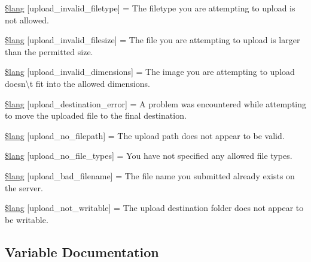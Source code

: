 \begin{DoxyCompactItemize}
\item 
\hyperlink{upload__lang_8php_ac8631aa85ed80396bd78e91a76d5fd38}{\$lang} \mbox{[}\textquotesingle{}upload\+\_\+invalid\+\_\+filetype\textquotesingle{}\mbox{]} = \textquotesingle{}The filetype you are attempting to upload is not allowed.\textquotesingle{}
\item 
\hyperlink{upload__lang_8php_a832b3ec1d84b1d48a488cf525954d8f2}{\$lang} \mbox{[}\textquotesingle{}upload\+\_\+invalid\+\_\+filesize\textquotesingle{}\mbox{]} = \textquotesingle{}The file you are attempting to upload is larger than the permitted size.\textquotesingle{}
\item 
\hyperlink{upload__lang_8php_a4e796eeccf7df90acffea7884a5bd558}{\$lang} \mbox{[}\textquotesingle{}upload\+\_\+invalid\+\_\+dimensions\textquotesingle{}\mbox{]} = \textquotesingle{}The image you are attempting to upload doesn\textbackslash{}\textquotesingle{}t fit into the allowed dimensions.\textquotesingle{}
\item 
\hyperlink{upload__lang_8php_a31be70c748b9bfc43dd7468e1fa64c42}{\$lang} \mbox{[}\textquotesingle{}upload\+\_\+destination\+\_\+error\textquotesingle{}\mbox{]} = \textquotesingle{}A problem was encountered while attempting to move the uploaded file to the final destination.\textquotesingle{}
\item 
\hyperlink{upload__lang_8php_a3c17908c53072c6a5ef593760aaaa704}{\$lang} \mbox{[}\textquotesingle{}upload\+\_\+no\+\_\+filepath\textquotesingle{}\mbox{]} = \textquotesingle{}The upload path does not appear to be valid.\textquotesingle{}
\item 
\hyperlink{upload__lang_8php_ab188c98e583c81905dedaad54ad452bb}{\$lang} \mbox{[}\textquotesingle{}upload\+\_\+no\+\_\+file\+\_\+types\textquotesingle{}\mbox{]} = \textquotesingle{}You have not specified any allowed file types.\textquotesingle{}
\item 
\hyperlink{upload__lang_8php_abb379322384f3f35952a539c63e2c8f7}{\$lang} \mbox{[}\textquotesingle{}upload\+\_\+bad\+\_\+filename\textquotesingle{}\mbox{]} = \textquotesingle{}The file name you submitted already exists on the server.\textquotesingle{}
\item 
\hyperlink{upload__lang_8php_aed6bfb5a9094179427f61fcbb582145b}{\$lang} \mbox{[}\textquotesingle{}upload\+\_\+not\+\_\+writable\textquotesingle{}\mbox{]} = \textquotesingle{}The upload destination folder does not appear to be writable.\textquotesingle{}
\end{DoxyCompactItemize}


\subsection{Variable Documentation}
\hypertarget{upload__lang_8php_a6d12ff4074b1e4c6f22a4a5107fae5ee}{}
